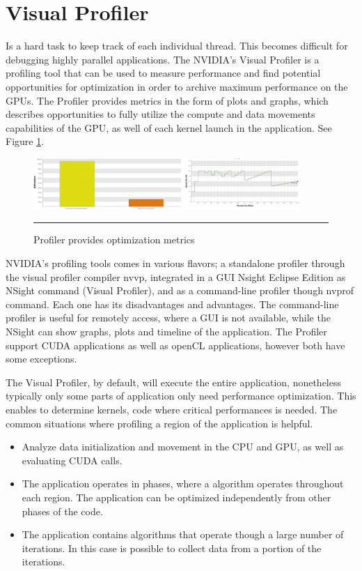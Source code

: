 \section{Visual Profiler}

Is a hard task to keep track of each individual thread. This becomes difficult for debugging highly parallel applications. The NVIDIA's Visual Profiler is a profiling tool that can be used to measure performance and find potential opportunities for optimization in order to archive maximum performance on the GPUs. The Profiler provides metrics in the form of plots and graphs, which describes opportunities to fully utilize the compute and data movements capabilities of the GPU, as well of each kernel launch in the application. See Figure \ref{fig:visualgraph}.

\begin{figure}[htbp]
	\centering
		\includegraphics[width=0.9\textwidth]{Figures/visualgraph.png}
		\rule{35em}{0.2pt}
	\caption[Visual Profiler metrics graphs and plots]{Profiler provides optimization metrics}
	\label{fig:visualgraph}
\end{figure}

NVIDIA's profiling tools comes in various flavors; a standalone profiler through the visual profiler compiler nvvp, integrated in a GUI Nsight Eclipse Edition as NSight command (Visual Profiler), and as a command-line profiler though nvprof command. Each one has its disadvantages and advantages. The command-line profiler is useful for remotely access, where a GUI is not available, while the NSight can show graphs, plots and timeline of the application. The Profiler support CUDA applications as well as openCL applications, however both have some exceptions. 

The Visual Profiler, by default, will execute the entire application, nonetheless typically only some parts of application only need performance optimization. This enables to determine kernels, code where critical performances is needed. The common situations where profiling a region of the application is helpful.\cite{tool}

\begin{itemize}
  \item Analyze data initialization and movement in the CPU and GPU, as well as evaluating CUDA calls.
  \item The application operates in phases, where a algorithm operates throughout each region. The application can be optimized independently from other phases of the code.
  \item The application contains algorithms that operate though a large number of iterations. In this case is possible to collect data from a portion of the iterations.
\end{itemize}

